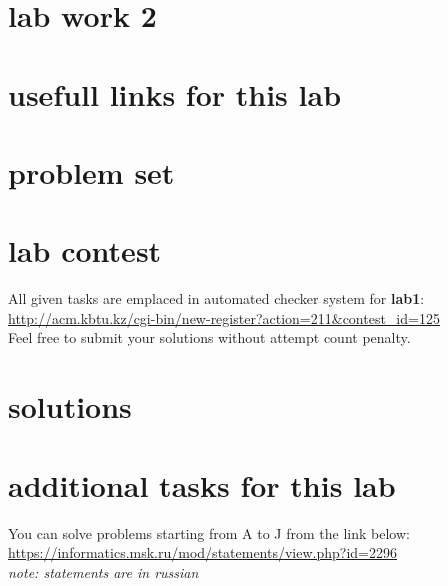 \documentclass[12pt]{article}%
\begin{document}
    \section{lab work 2}
    \section{usefull links for this lab}
    \section{problem set}

    \section{lab contest}
    
    All given tasks are emplaced in automated checker system for \textbf{lab1}: \url{http://acm.kbtu.kz/cgi-bin/new-register?action=211&contest_id=125}\\
    Feel free to submit your solutions without attempt count penalty.

    \section{solutions}

    
    
    
    
    
    
    
    
    
    
    
    
    
    
    




    \section{additional tasks for this lab}
    You can solve problems starting from A to J from the link below:\\
    \url{https://informatics.msk.ru/mod/statements/view.php?id=2296}\\
    \textit{note: statements are in russian}
\end{document}
